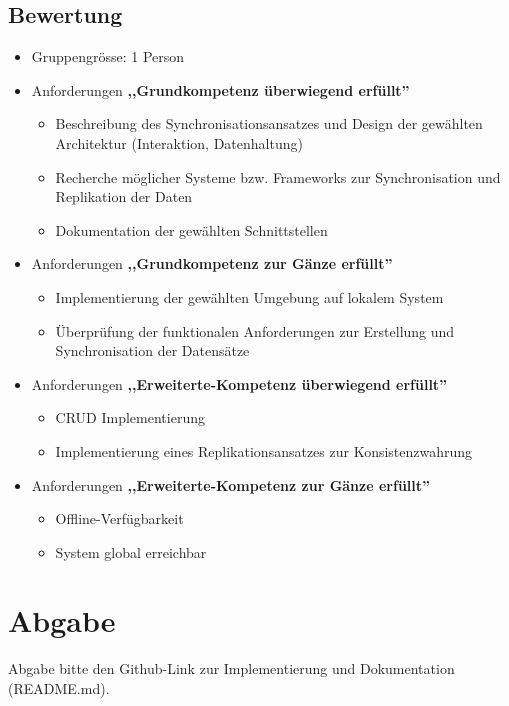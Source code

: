 \subsection{Bewertung}
\begin{itemize}
	\item Gruppengrösse: 1 Person
    \item Anforderungen {\bf ,,Grundkompetenz überwiegend erfüllt''}
	\begin{itemize}
		\item Beschreibung des Synchronisationsansatzes und Design der gewählten Architektur (Interaktion, Datenhaltung)
        \item Recherche möglicher Systeme bzw. Frameworks zur Synchronisation und Replikation der Daten
        \item Dokumentation der gewählten Schnittstellen
	\end{itemize}
    \item Anforderungen {\bf ,,Grundkompetenz zur Gänze erfüllt''}
		\begin{itemize}
			\item Implementierung der gewählten Umgebung auf lokalem System
	        \item Überprüfung der funktionalen Anforderungen zur Erstellung und Synchronisation der Datensätze
		\end{itemize}
    \item Anforderungen {\bf ,,Erweiterte-Kompetenz überwiegend erfüllt''}
	\begin{itemize}
		\item CRUD Implementierung
        \item Implementierung eines Replikationsansatzes zur Konsistenzwahrung
	\end{itemize}
    \item Anforderungen {\bf ,,Erweiterte-Kompetenz zur Gänze erfüllt''}
	\begin{itemize}
		\item Offline-Verfügbarkeit
        \item System global erreichbar
	\end{itemize}
\end{itemize}

\section{Abgabe}
Abgabe bitte den Github-Link zur Implementierung und Dokumentation (README.md).
